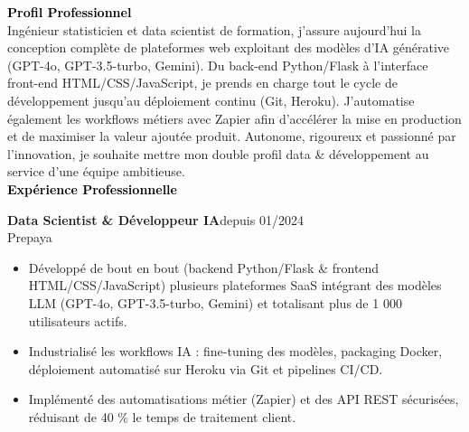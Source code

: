 \documentclass{article}
\begin{document}
\begin{paracol}{2}
\switchcolumn
\color{black}

\textcolor{black}{\Large \textbf{Profil Professionnel}} \\[2pt]
Ingénieur statisticien et data scientist de formation, j’assure aujourd’hui la conception complète de plateformes web exploitant des modèles d’IA générative (GPT-4o, GPT-3.5-turbo, Gemini). Du back-end Python/Flask à l’interface front-end HTML/CSS/JavaScript, je prends en charge tout le cycle de développement jusqu’au déploiement continu (Git, Heroku). J’automatise également les workflows métiers avec Zapier afin d’accélérer la mise en production et de maximiser la valeur ajoutée produit. Autonome, rigoureux et passionné par l’innovation, je souhaite mettre mon double profil data \& développement au service d’une équipe ambitieuse. \\[8pt]

\textcolor{black}{\Large \textbf{Expérience Professionnelle}} \\[2pt]
\colorbox{maincolor}{%
  \begin{minipage}{\linewidth}
    \noindent
    \textbf{Data Scientist \& Développeur IA}\hfill depuis 01/2024\\
    Prepaya\\[-0.3em]
    \begin{itemize}[leftmargin=*]
      \item Développé de bout en bout (backend Python/Flask \& frontend HTML/CSS/JavaScript) plusieurs plateformes SaaS intégrant des modèles LLM (GPT-4o, GPT-3.5-turbo, Gemini) et totalisant plus de 1 000 utilisateurs actifs. \item Industrialisé les workflows IA : fine-tuning des modèles, packaging Docker, déploiement automatisé sur Heroku via Git et pipelines CI/CD. \item Implémenté des automatisations métier (Zapier) et des API REST sécurisées, réduisant de 40 \% le temps de traitement client.
    \end{itemize}
  \end{minipage}}

\vspace{3mm}


\end{paracol}
\end{document}
